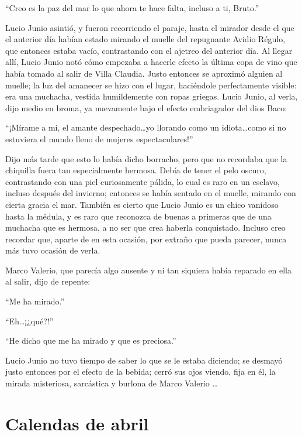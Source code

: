 \documentclass[11pt,openany]{book}
\begin{document}
“Creo es la paz del mar lo que ahora te hace falta, incluso a ti, Bruto.” 

Lucio Junio asintió, y fueron recorriendo el paraje, hasta el mirador desde el que el anterior día habían estado mirando el muelle del repugnante Avidio Régulo, que entonces estaba vacío, contrastando con el ajetreo del anterior día. Al llegar allí, Lucio Junio notó cómo empezaba a hacerle efecto la última copa de vino que había tomado al salir de Villa Claudia. Justo entonces se aproximó alguien al muelle; la luz del amanecer se hizo con el lugar, haciéndole perfectamente visible: era una muchacha, vestida humildemente con ropas griegas. Lucio Junio, al verla, dijo medio en broma, ya nuevamente bajo el efecto embriagador del dios Baco: 

“¡Mírame a mí, el amante despechado\dots yo llorando como un idiota\dots como si no estuviera el mundo lleno de mujeres espectaculares!” 

Dijo más tarde que esto lo había dicho borracho, pero que no recordaba que la chiquilla fuera tan especialmente hermosa. Debía de tener el pelo oscuro, contrastando con una piel curiosamente pálida, lo cual es raro en un esclavo, incluso después del invierno; entonces se había sentado en el muelle, mirando con cierta gracia el mar. También es cierto que Lucio Junio es un chico vanidoso hasta la médula, y es raro que reconozca de buenas a primeras que de una muchacha que es hermosa, a no ser que crea haberla conquistado. Incluso creo recordar que, aparte de en esta ocasión, por extraño que pueda parecer, nunca más tuvo ocasión de verla. 

Marco Valerio, que parecía algo ausente y ni tan siquiera había reparado en ella al salir, dijo de repente: 

“Me ha mirado.” 

“Eh\dots ¡¿qué?!” 

“He dicho que me ha mirado y que es preciosa.” 

Lucio Junio no tuvo tiempo de saber lo que se le estaba diciendo; se desmayó justo entonces por el efecto de la bebida; cerró sus ojos viendo, fija en él, la mirada misteriosa, sarcástica y burlona de Marco Valerio \dots

\chapter{Calendas de abril}
\end{document}
